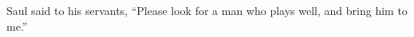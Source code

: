 \begin{inparaenum}
     Saul said to his servants, ``Please look for a man who plays well, and bring him to me.''%
\end{inparaenum}
